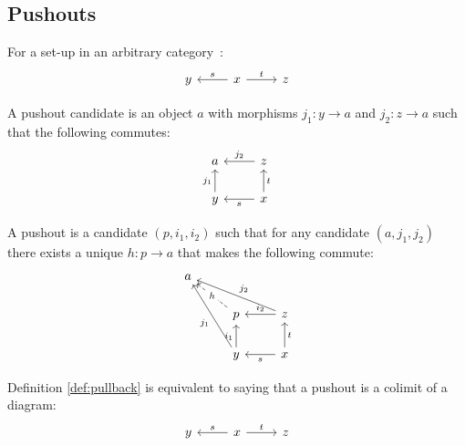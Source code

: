 \subsection{Pushouts}

\begin{definition}
  For a set-up in an arbitrary
  category~\parencite[p.~130]{leinster:basic_category_theory}:
  \[\begin{tikzcd}[ampersand replacement=\&]
    y \& x \& z
    \arrow["t", from=1-2, to=1-3]
    \arrow["s"', from=1-2, to=1-1]
  \end{tikzcd}\]

  A pushout candidate is an object $a$ with morphisms $j_1: y \to a$ and $j_2:
  z\to a$ such that the following commutes:
  \[\begin{tikzcd}[ampersand replacement=\&]
    a \& z \\
    y \& x
    \arrow["t"', from=2-2, to=1-2]
    \arrow["s", from=2-2, to=2-1]
    \arrow["{j_1}", from=2-1, to=1-1]
    \arrow["{j_2}"', from=1-2, to=1-1]
  \end{tikzcd}\]

  A pushout is a candidate $(p, i_1, i_2)$ such that for any candidate $(a,
  j_1, j_2)$ there exists a unique $h:p\to a$ that makes the following
  commute:
  \[\begin{tikzcd}[ampersand replacement=\&]
    a \\
    \& p \& z \\
    \& y \& x
    \arrow["t"', from=3-3, to=2-3]
    \arrow["s", from=3-3, to=3-2]
    \arrow["{i_1}", from=3-2, to=2-2]
    \arrow["{i_2}"', from=2-3, to=2-2]
    \arrow["h"{description}, dashed, from=2-2, to=1-1]
    \arrow["{j_1}", from=3-2, to=1-1]
    \arrow["{j_2}"', from=2-3, to=1-1]
  \end{tikzcd}\]
\end{definition}

\begin{definition}
  Definition \ref{def:pullback} is equivalent to saying that a pushout is a
  colimit of a diagram:
  \[\begin{tikzcd}[ampersand replacement=\&]
    y \& x \& z
    \arrow["t", from=1-2, to=1-3]
    \arrow["s"', from=1-2, to=1-1]
  \end{tikzcd}\]
\end{definition}